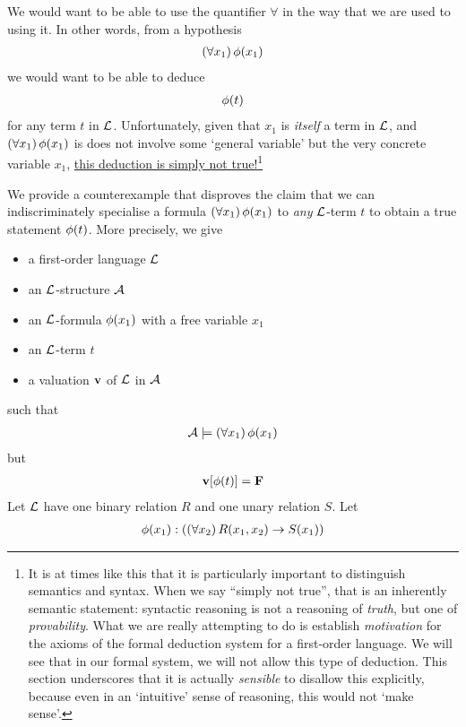 We would want to be able to use the quantifier $\forall$ in the way that we are used to using it. In other words, from a hypothesis
\begin{align*}
    \left( \forall x_1 \right) \phi\!\left( x_1 \right)
\end{align*}
we would want to be able to deduce
\begin{align*}
    \phi\!\left( t \right)
\end{align*}
for any term $t$ in $\mathcal{L}$. Unfortunately, given that $x_1$ is \textit{itself} a term in $\mathcal{L}$, and $\left( \forall x_1 \right) \phi\!\left( x_1 \right)$ is does not involve some `general variable' but the very concrete variable $x_1$, \underline{this deduction is simply not true!}\footnote{It is at times like this that it is particularly important to distinguish semantics and syntax. When we say ``simply not true'', that is an inherently semantic statement: syntactic reasoning is not a reasoning of \textit{truth}, but one of \textit{provability}. What we are really attempting to do is establish \textit{motivation} for the axioms of the formal deduction system for a first-order language. We will see that in our formal system, we will not allow this type of deduction. This section underscores that it is actually \textit{sensible} to disallow this explicitly, because even in an `intuitive' sense of reasoning, this would not `make sense'.}

\begin{boxcexample}
    We provide a counterexample that disproves the claim that we can indiscriminately specialise a formula $\left( \forall x_1 \right) \phi\!\left( x_1 \right)$ to \textit{any} $\mathcal{L}$-term $t$ to obtain a true statement $\phi\!\left( t \right)$. More precisely, we give
    \begin{itemize}
        \item a first-order language $\mathcal{L}$
        \item an $\mathcal{L}$-structure $\mathcal{A}$
        \item an $\mathcal{L}$-formula $\phi\!\left( x_1 \right)$ with a free variable $x_1$
        \item an $\mathcal{L}$-term $t$
        \item a valuation $\mathbf{v}$ of $\mathcal{L}$ in $\mathcal{A}$
    \end{itemize}
    such that
    \begin{align*}
        \mathcal{A} \models \left( \forall x_1 \right)\phi\!\left( x_1 \right)
    \end{align*}
    but
    \begin{align*}
        \mathbf{v}\!\left[ \phi\!\left( t \right) \right] = \mathbf{F}
    \end{align*}
    Let $\mathcal{L}$ have one binary relation $R$ and one unary relation $S$. Let
    \begin{align*}
        \phi\!\left( x_1 \right) : \left( \left( \forall x_2 \right)R\!\left( x_1, x_2 \right) \to S\!\left( x_1 \right) \right)
    \end{align*}
    \sorry
\end{boxcexample}

\sorry

